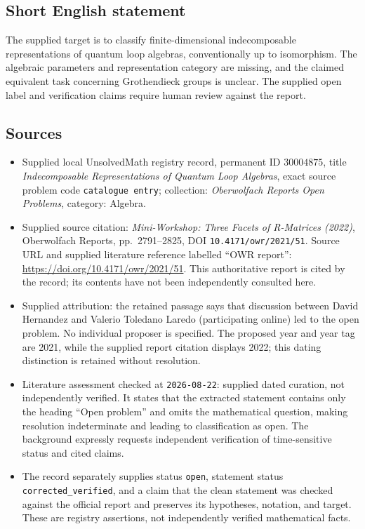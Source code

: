 \documentclass[11pt]{article}
\begin{document}
\subsection{Short English statement}
The supplied target is to classify finite-dimensional indecomposable representations of quantum loop algebras, conventionally up to isomorphism. The algebraic parameters and representation category are missing, and the claimed equivalent task concerning Grothendieck groups is unclear. The supplied open label and verification claims require human review against the report.
\subsection{Sources}
\begin{itemize}
\item Supplied local UnsolvedMath registry record, permanent ID \(30004875\), title \emph{Indecomposable Representations of Quantum Loop Algebras}, exact source problem code \texttt{catalogue entry}; collection: \emph{Oberwolfach Reports Open Problems}, category: Algebra.
\item Supplied source citation: \emph{Mini-Workshop: Three Facets of R-Matrices (2022)}, Oberwolfach Reports, pp.~2791--2825, DOI \texttt{10.4171/owr/2021/51}. Source URL and supplied literature reference labelled ``OWR report'': \url{https://doi.org/10.4171/owr/2021/51}. This authoritative report is cited by the record; its contents have not been independently consulted here.
\item Supplied attribution: the retained passage says that discussion between David Hernandez and Valerio Toledano Laredo (participating online) led to the open problem. No individual proposer is specified. The proposed year and year tag are 2021, while the supplied report citation displays 2022; this dating distinction is retained without resolution.
\item Literature assessment checked at \texttt{2026-08-22}: supplied dated curation, not independently verified. It states that the extracted statement contains only the heading ``Open problem'' and omits the mathematical question, making resolution indeterminate and leading to classification as open. The background expressly requests independent verification of time-sensitive status and cited claims.
\item The record separately supplies status \texttt{open}, statement status \texttt{corrected\_verified}, and a claim that the clean statement was checked against the official report and preserves its hypotheses, notation, and target. These are registry assertions, not independently verified mathematical facts.
\end{itemize}
\end{document}
